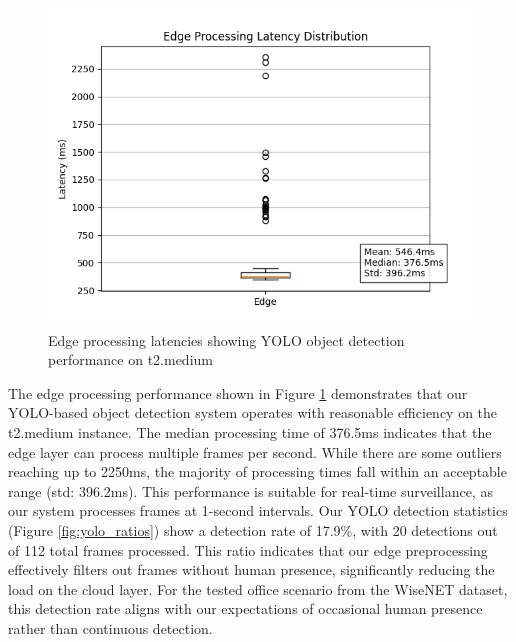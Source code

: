 \documentclass[conference]{IEEEtran}
\begin{document}
\begin{figure}[h!]
    \centering
    \includegraphics[width=1\linewidth]{./res/evaluation_with_latencies/edge_latencies.png}
    \caption{Edge processing latencies showing YOLO object detection performance on t2.medium }
    \label{fig:edge_latencies}
\end{figure}

The edge processing performance shown in Figure \ref{fig:edge_latencies} demonstrates that our YOLO-based object detection system operates with reasonable efficiency on the t2.medium instance. The median processing time of 376.5ms indicates that the edge layer can process multiple frames per second. While there are some outliers reaching up to 2250ms, the majority of processing times fall within an acceptable range (std: 396.2ms). This performance is suitable for real-time surveillance, as our system processes frames at 1-second intervals.
Our YOLO detection statistics (Figure \ref{fig:yolo_ratios}) show a detection rate of 17.9\%, with 20 detections out of 112 total frames processed. This ratio indicates that our edge preprocessing effectively filters out frames without human presence, significantly reducing the load on the cloud layer. For the tested office scenario from the WiseNET dataset, this detection rate aligns with our expectations of occasional human presence rather than continuous detection.
\end{document}
